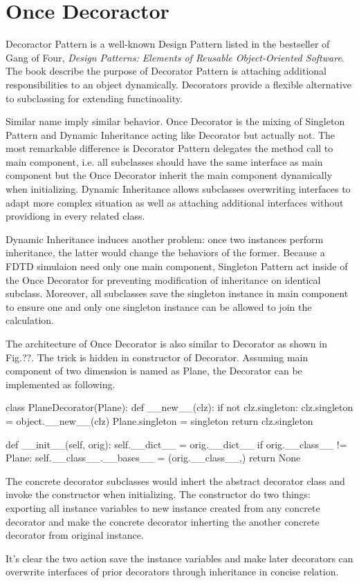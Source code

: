 \section{Once Decoractor}
Decoractor Pattern is a well-known Design Pattern listed in the bestseller of Gang of Four, \textit{Design Patterns:
  Elements of Reusable Object-Oriented Software}. The book describe the purpose of Decorator Pattern is attaching
additional responsibilities to an object dynamically. Decorators provide a flexible alternative to subclassing for
extending functinoality.

Similar name imply similar behavior. Once Decorator is the mixing of Singleton Pattern and Dynamic Inheritance acting
like Decorator but actually not. The most remarkable difference is Decorator Pattern delegates the method call to main
component, i.e. all subclasses should have the same interface as main component but the Once Decorator inherit the main
component dynamically when initializing. Dynamic Inheritance allows subclasses overwriting interfaces to adapt more
complex situation as well as attaching additional interfaces without providiong in every related class.

Dynamic Inheritance induces another problem: once two instances perform inheritance, the latter would change the
behaviors of the former. Because a FDTD simulaion need only one main component, Singleton Pattern act inside of the Once
Decorator for preventing modification of inheritance on identical subclass. Moreover, all subclasses save the singleton
instance in main component to ensure one and only one singleton instance can be allowed to join the calculation.

The architecture of Once Decorator is also similar to Decorator as shown in Fig.??. The trick is hidden in constructor
of Decorator. Assuming main component of two dimension is named as Plane, the Decorator can be implemented as following.
\begin{code}
  class PlaneDecorator(Plane):
    def __new__(clz):
        if not clz.singleton:
            clz.singleton = object.__new__(clz)
            Plane.singleton = singleton
        return clz.singleton

    def __init__(self, orig):
        self.__dict__ = orig.__dict__
        if orig.__class__ != Plane:
            self.__class__.__bases__ = (orig.__class__,)
        return None
\end{code}
The concrete decorator subclasses would inhert the abstract decorator class and invoke the constructor when
initializing. The constructor do two things: exporting all instance variables to new instance created from any concrete
decorator and make the concrete decorator inherting the another concrete decorator from original instance.

It's clear the two action save the instance variables and make later decorators can overwrite interfaces of prior
decorators through inheritance in concise relation.
